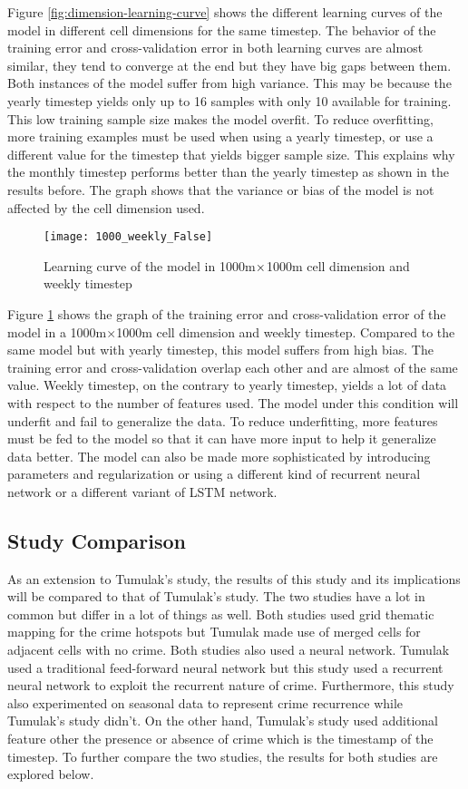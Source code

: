     Figure \ref{fig:dimension-learning-curve} shows the different learning curves of the model in different cell dimensions for the same timestep. The behavior of the training error and cross-validation error in both learning curves are almost similar, they tend to converge at the end but they have big gaps between them. Both instances of the model suffer from high variance. This may be because the yearly timestep yields only up to 16 samples with only 10 available for training. This low training sample size makes the model overfit. To reduce overfitting, more training examples must be used when using a yearly timestep, or use a different value for the timestep that yields bigger sample size. This explains why the monthly timestep performs better than the yearly timestep as shown in the results before. The graph shows that the variance or bias of the model is not affected by the cell dimension used.

    \begin{figure}[H]
      \centering
      \texttt{[image: 1000\_weekly\_False]}
      \caption{Learning curve of the model in 1000m$\protect\times$1000m cell dimension and weekly timestep}
      \label{fig:learning-curve2}
    \end{figure}
    Figure \ref{fig:learning-curve2} shows the graph of the training error and cross-validation error of the model in a 1000m\(\times\)1000m cell dimension and weekly timestep. Compared to the same model but with yearly timestep, this model suffers from high bias. The training error and cross-validation overlap each other and are almost of the same value. Weekly timestep, on the contrary to yearly timestep, yields a lot of data with respect to the number of features used. The model under this condition will underfit and fail to generalize the data. To reduce underfitting, more features must be fed to the model so that it can have more input to help it generalize data better. The model can also be made more sophisticated by introducing parameters and regularization or using a different kind of recurrent neural network or a different variant of LSTM network.

\subsection{Study Comparison}

  As an extension to Tumulak's study, the results of this study and its implications will be compared to that of Tumulak's study. The two studies have a lot in common but differ in a lot of things as well. Both studies used grid thematic mapping for the crime hotspots but Tumulak made use of merged cells for adjacent cells with no crime. Both studies also used a neural network. Tumulak used a traditional feed-forward neural network but this study used a recurrent neural network to exploit the recurrent nature of crime. Furthermore, this study also experimented on seasonal data to represent crime recurrence while Tumulak's study didn't. On the other hand, Tumulak's study used additional feature other the presence or absence of crime which is the timestamp of the timestep. To further compare the two studies, the results for both studies are explored below.

